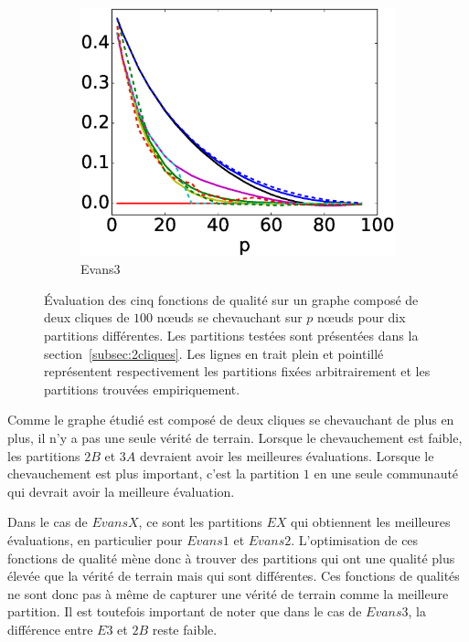 \begin{figure}[h]
\begin{subfigure}{0.31\textwidth}
		\includegraphics[width=\linewidth]{img/ExpectedNodes/2Cliques/2Clique_Evans3.eps}
		\caption{\label{fig:2CE3}Evans3}		
	\end{subfigure}
	\caption{\'Evaluation des cinq fonctions de qualité sur un graphe composé de deux cliques de $100$ n\oe{}uds se chevauchant sur $p$ n\oe{}uds pour dix partitions différentes.
	Les partitions testées sont présentées dans la section~\ref{subsec:2cliques}.
	Les lignes en trait plein et pointillé représentent respectivement les partitions fixées arbitrairement et les partitions trouvées empiriquement.}
	\label{fig:2Cres}
\end{figure}

Comme le graphe étudié est composé de deux cliques se chevauchant de plus en plus, il n'y a pas une seule vérité de terrain.
Lorsque le chevauchement est faible, les partitions $2B$ et $3A$ devraient avoir les meilleures évaluations.
Lorsque le chevauchement est plus important, c'est la partition $1$ en une seule communauté qui devrait avoir la meilleure évaluation.

Dans le cas de $EvansX$, ce sont les partitions $EX$ qui obtiennent les meilleures évaluations, en particulier pour $Evans1$ et $Evans2$.
L'optimisation de ces fonctions de qualité mène donc à trouver des partitions qui ont une qualité plus élevée que la vérité de terrain mais qui sont différentes.
Ces fonctions de qualités ne sont donc pas à même de capturer une vérité de terrain comme la meilleure partition.
Il est toutefois important de noter que dans le cas de $Evans3$, la différence entre $E3$ et $2B$ reste faible.


